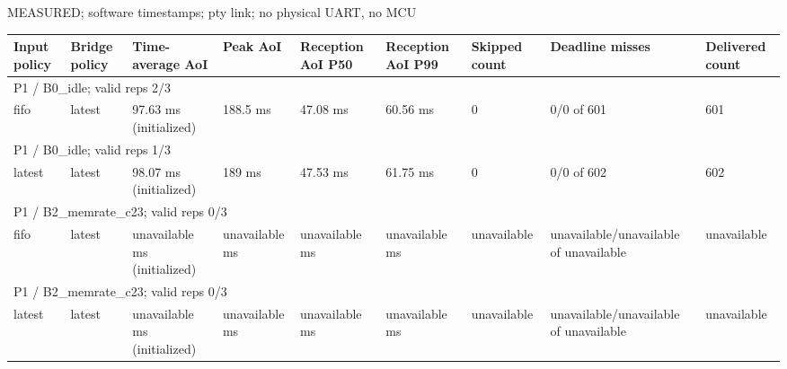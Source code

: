\par\noindent MEASURED; software timestamps; pty link; no physical UART, no MCU\par
\begin{tabular}{lllllllll}
\toprule
Input policy & Bridge policy & Time-average AoI & Peak AoI & Reception AoI P50 & Reception AoI P99 & Skipped count & Deadline misses & Delivered count \\
\midrule
\multicolumn{9}{l}{P1 / B0\_idle; valid reps 2/3} \\
fifo & latest & 97.63 ms (initialized) & 188.5 ms & 47.08 ms & 60.56 ms & 0 & 0/0 of 601 & 601 \\
\multicolumn{9}{l}{P1 / B0\_idle; valid reps 1/3} \\
latest & latest & 98.07 ms (initialized) & 189 ms & 47.53 ms & 61.75 ms & 0 & 0/0 of 602 & 602 \\
\multicolumn{9}{l}{P1 / B2\_memrate\_c23; valid reps 0/3} \\
fifo & latest & unavailable ms (initialized) & unavailable ms & unavailable ms & unavailable ms & unavailable & unavailable/unavailable of unavailable & unavailable \\
\multicolumn{9}{l}{P1 / B2\_memrate\_c23; valid reps 0/3} \\
latest & latest & unavailable ms (initialized) & unavailable ms & unavailable ms & unavailable ms & unavailable & unavailable/unavailable of unavailable & unavailable \\
\bottomrule
\end{tabular}
